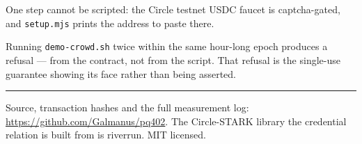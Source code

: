 \documentclass[11pt,a4paper]{article}
\begin{document}
One step cannot be scripted: the Circle testnet USDC faucet is captcha-gated,
and \texttt{setup.mjs} prints the address to paste there.

Running \texttt{demo-crowd.sh} twice within the same hour-long epoch produces a
refusal --- from the contract, not from the script. That refusal is the
single-use guarantee showing its face rather than being asserted.

\vspace{1.5em}
\hrule
\vspace{0.8em}
\noindent
\footnotesize
Source, transaction hashes and the full measurement log:
\url{https://github.com/Galmanus/pq402}. The Circle-STARK library the
credential relation is built from is riverrun. MIT licensed.
\end{document}

